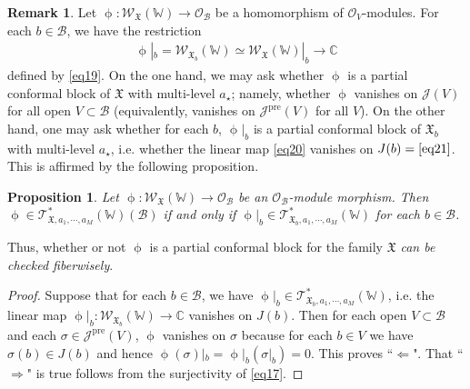 \documentclass[11pt,b5paper,notitlepage]{article}
\theoremstyle{definition}
\newtheorem{rem}[df]{Remark}
\theoremstyle{plain}
\newtheorem{pp}[df]{Proposition}
\newcommand{\fk}{\mathfrak}
\newcommand{\mc}{\mathcal}
\newcommand{\scr}{\mathscr}
\newcommand{\Wbb}{\mathbb W}
\newcommand{\Cbb}{\mathbb C}
\newcommand{\<}{\left\langle}
\renewcommand{\>}{\right\rangle}
\newcommand{\MO}{\mathcal{O}}
\newcommand{\fx}{\mathfrak{X}}
\newcommand{\ST}{\mathscr{T}}
\newcommand{\SW}{\mathscr{W}}
\newcommand{\pre}{\mathrm{pre}}
\numberwithin{equation}{subsection}
\begin{document}
\begin{rem}
Let $\upphi:\SW_\fx(\Wbb)\rightarrow \MO_{\mc B}$ be a homomorphism of $\MO_V$-modules. For each $b\in \mc B$, we have the restriction
\begin{align}\label{eq20}
\upphi|_b=\scr W_{\fk X_b}(\Wbb)\simeq \scr W_{\fk X}(\Wbb)|_b\rightarrow\Cbb
\end{align}
defined by \eqref{eq19}. On the one hand, we may ask whether $\upphi$ is a partial conformal block of $\fk X$ with multi-level $a_\star$; namely, whether $\upphi$ vanishes on $\scr J(V)$ for all open $V\subset\mc B$ (equivalently, vanishes on $\scr J^\pre(V)$ for all $V$). On the other hand, one may ask whether for each $b$, $\upphi|_b$ is a partial conformal block of $\fk X_b$ with multi-level $a_\star$, i.e. whether the linear map \eqref{eq20} vanishes on $J(b)=\eqref{eq21}$. This is affirmed by the following proposition.
\end{rem}





\begin{pp}\label{familyfiber5}
Let $\upphi:\SW_\fx(\Wbb)\rightarrow \MO_{\mc B}$ be an $\MO_{\mc B}$-module morphism. Then $\upphi\in \ST_{\fx,a_1,\cdots,a_M}^*(\Wbb)(\mc B)$ if and only if $\upphi\vert_b\in \ST_{\fx_b,a_1,\cdots,a_M}^*(\Wbb)$ for each $b\in \mc B$. 
\end{pp}

Thus, whether or not $\upphi$ is a partial conformal block for the family $\fk X$ \emph{can be checked fiberwisely}.

\begin{proof}
Suppose that for each $b\in \mc B$, we have $\upphi\vert_b\in \ST_{\fx_b,a_1,\cdots,a_M}^*(\Wbb)$, i.e. the linear map $\upphi|_b:\scr W_{\fk X_b}(\Wbb)\rightarrow\Cbb$ vanishes on $J(b)$. Then for each open $V\subset\mc B$ and each $\sigma\in\scr J^\pre(V)$, $\upphi$ vanishes on $\sigma$ because for each $b\in V$ we have $\sigma(b)\in J(b)$ and hence $\upphi(\sigma)|_b=\upphi|_b(\sigma|_b)=0$. This proves ``$\Leftarrow $". That ``$\Rightarrow$" is true follows from the surjectivity of \eqref{eq17}.
\end{proof}
\end{document}
